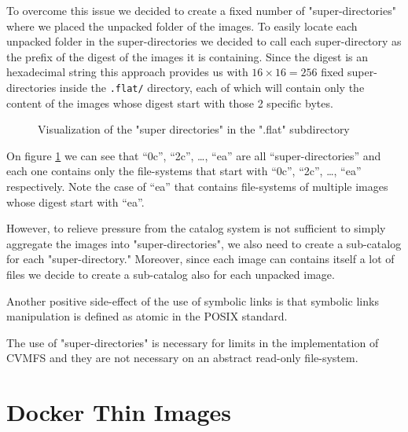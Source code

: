 To overcome this issue we decided to create a fixed number of
"super-directories" where we placed the unpacked folder of the images.  To
easily locate each unpacked folder in the super-directories we decided to call
each super-directory as the prefix of the digest of the images it is
containing. Since the digest is an hexadecimal string this approach provides us
with $16 \times 16 = 256$ fixed super-directories inside the \texttt{.flat/}
directory, each of which will contain only the content of the images whose
digest start with those 2 specific bytes.

\begin{figure}
\caption{Visualization of the "super directories" in the ".flat" subdirectory}
\label{fig:super-directories}
\end{figure}

On figure \ref{fig:super-directories} we can see that “0c”, “2c”, …, “ea” are
all “super-directories” and each one contains only the file-systems that start
with “0c”, “2c”, …, “ea” respectively.  Note the case of “ea” that contains
file-systems of multiple images whose digest start with “ea”.

However, to relieve pressure from the catalog system is not sufficient to
simply aggregate the images into "super-directories", we also need to create a
sub-catalog for each "super-directory." Moreover, since each image can contains
itself a lot of files we decide to create a sub-catalog also for each unpacked
image.

Another positive side-effect of the use of symbolic links is that symbolic
links manipulation is defined as atomic in the POSIX standard.

The use of "super-directories" is necessary for limits in the implementation of
CVMFS and they are not necessary on an abstract read-only file-system.

\section{Docker Thin Images}
\label{sec:methodology-docker}


